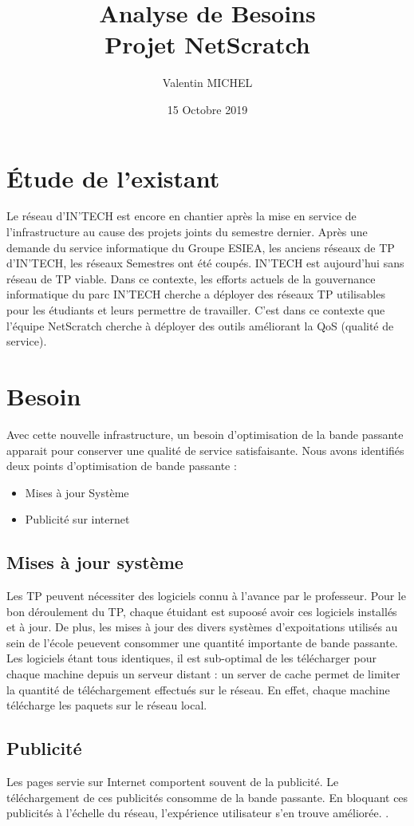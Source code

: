 \documentclass[14pt,a4paper]{extarticle}
\author{Valentin MICHEL}
\date{15 Octobre 2019}
\title{Analyse de Besoins \\ Projet NetScratch}
\begin{document}
\maketitle{}

\break
\section{Étude de l'existant}
Le réseau d'IN'TECH est encore en chantier après la mise en service de l'infrastructure au cause des projets joints du semestre dernier.
Après une demande du service informatique du Groupe ESIEA, les anciens réseaux de TP d'IN'TECH, les réseaux Semestres ont été coupés. IN'TECH est aujourd'hui sans réseau de TP viable.
Dans ce contexte, les efforts actuels de la gouvernance informatique du parc IN'TECH cherche a déployer des réseaux TP utilisables pour les étudiants et leurs permettre de travailler.
C'est dans ce contexte que l'équipe NetScratch cherche à déployer des outils améliorant la QoS (qualité de service).
\section{Besoin}
Avec cette nouvelle infrastructure, un besoin d'optimisation de la bande passante apparait pour conserver une qualité de service satisfaisante. 
Nous avons identifiés deux points d'optimisation de bande passante :
\begin{itemize}
	\item{Mises à jour Système}
	\item{Publicité sur internet}
\end{itemize}
\subsection{Mises à jour système}
Les TP peuvent nécessiter des logiciels connu à l'avance par le professeur. Pour le bon déroulement du TP, chaque étuidant est supoosé avoir ces logiciels installés et à jour.
De plus, les mises à jour des divers systèmes d'expoitations utilisés au sein de l'école peuevent consommer une quantité importante de bande passante.
Les logiciels étant tous identiques, il est sub-optimal de les télécharger pour chaque machine depuis un serveur distant : un server de cache permet de limiter la quantité de téléchargement effectués sur le réseau. En effet, chaque machine télécharge les paquets sur le réseau local.
\subsection{Publicité}
Les pages servie sur Internet comportent souvent de la publicité. 
Le téléchargement de ces publicités consomme de la bande passante. En bloquant ces publicités à l'échelle du réseau, l'expérience utilisateur s'en trouve améliorée.
.
\end{document}
